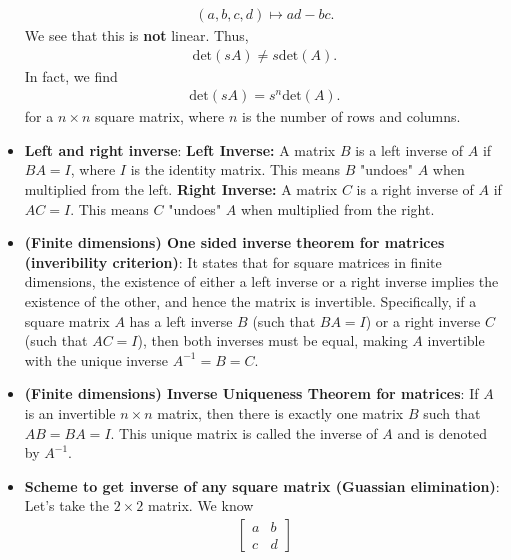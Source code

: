 \documentclass{report}
\begin{document}
\begin{itemize}
                \begin{align*}
                    (a,b,c,d) \mapsto ad-bc
                .\end{align*}
                We see that this is \textbf{not} linear. Thus,
                \begin{align*}
                    \text{det}(sA) \ne s\text{det}(A)
                .\end{align*}
                In fact, we find
                \begin{align*}
                    \text{det}(sA) = s^{n}\text{det}(A)
                .\end{align*}
                for a $n\times n$ square matrix, where $n$ is the number of rows and columns.
            \item \textbf{Left and right inverse}:
                \textbf{Left Inverse:} A matrix \( B \) is a left inverse of \( A \) if \( BA = I \), where \( I \) is the identity matrix. This means \( B \) "undoes" \( A \) when multiplied from the left.
                \bigbreak \noindent 
                \textbf{Right Inverse:} A matrix \( C \) is a right inverse of \( A \) if \( AC = I \). This means \( C \) "undoes" \( A \) when multiplied from the right.
            \item \textbf{(Finite dimensions) One sided inverse theorem for matrices (inveribility criterion)}: It states that for square matrices in finite dimensions, the existence of either a left inverse or a right inverse implies the existence of the other, and hence the matrix is invertible. Specifically, if a square matrix \( A \) has a left inverse \( B \) (such that \( BA = I \)) or a right inverse \( C \) (such that \( AC = I \)), then both inverses must be equal, making \( A \) invertible with the unique inverse \( A^{-1} = B = C \).
            \item \textbf{(Finite dimensions) Inverse Uniqueness Theorem for matrices}: If \( A \) is an invertible \( n \times n \) matrix, then there is exactly one matrix \( B \) such that \( AB = BA = I \). This unique matrix is called the inverse of \( A \) and is denoted by \( A^{-1} \).
            \item \textbf{Scheme to get inverse of any square matrix (Guassian elimination)}: Let's take the $2 \times 2$ matrix. We know
                \begin{align*}
                    \begin{bmatrix} a & b \\ c & d \end{bmatrix}

\end{align*}
\end{itemize}
\end{document}
